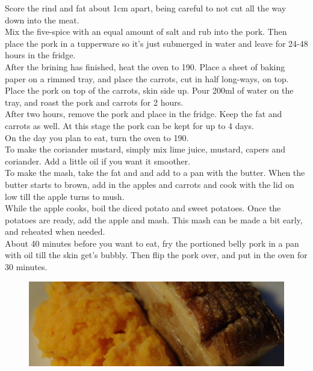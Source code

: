 \documentclass{tufte-book}
\begin{document}
\smallskip
Score the rind and fat about 1cm apart, being careful to not cut all the way down into the meat. 
\\Mix the five-spice with an equal amount of salt and rub into the pork. Then place the pork in a tupperware so it's just submerged in water and leave for 24-48 hours in the fridge.
\\After the brining has finished, heat the oven to 190\celsius. Place a sheet of baking paper on a rimmed tray, and place the carrots, cut in half long-ways, on top. 
\\Place the pork on top of the carrots, skin side up. Pour 200ml of water on the tray, and roast the pork and carrots for 2 hours. 
\\After two hours, remove the pork and place in the fridge. Keep the fat and carrots as well. At this stage the pork can be kept for up to 4 days.
\\On the day you plan to eat, turn the oven to 190\celsius. 
\\To make the coriander mustard, simply mix lime juice, mustard, capers and coriander. Add a little oil if you want it smoother. 
\\To make the mash, take the fat and and add to a pan with the butter. When the butter starts to brown, add in the apples and carrots and cook with the lid on low till the apple turns to mush. 
\\While the apple cooks, boil the diced potato and sweet potatoes. Once the potatoes are ready, add the apple and mash. This mash can be made a bit early, and reheated when needed. 
\\About 40 minutes before you want to eat, fry the portioned belly pork in a pan with oil till the skin get's bubbly. Then flip the pork over, and put in the oven for 30 minutes.

\begin{figure}[h]
  \includegraphics[width=\linewidth]{bellyporkwide.png}
\end{figure}

\newpage
\end{document}
